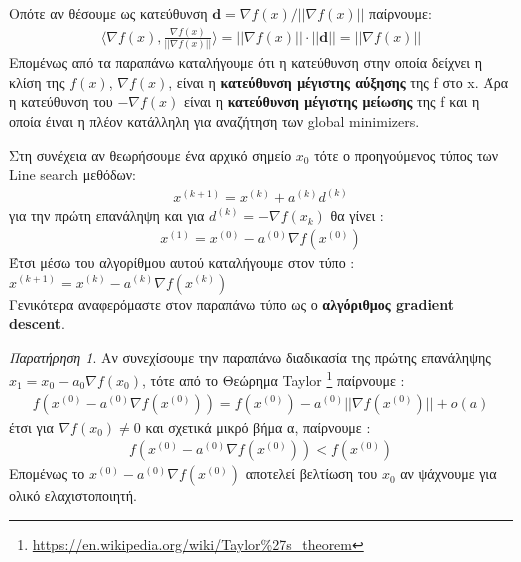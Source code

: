 \documentclass[a4paper,12pt,twoside]{report}
\theoremstyle{plain}
\theoremstyle{definition}
\theoremstyle{remark}
\newtheorem*{rem}{Παρατήρηση}
\begin{document}
Οπότε αν θέσουμε ως κατεύθυνση $\textbf{d} = \nabla f(x)/||\nabla f(x)||$ παίρνουμε:
\begin{align*}
\langle\nabla f(x), \frac{\nabla f(x)}{||\nabla f(x)||}\rangle = ||\nabla f(x)||\cdot||\textbf{d}||= ||\nabla f(x)||
\end{align*}
Επομένως από τα παραπάνω καταλήγουμε ότι η κατεύθυνση στην οποία δείχνει η κλίση της $f(x)$, $\nabla f(x)$, είναι η \textbf{κατεύθυνση μέγιστης αύξησης} της f	στο x. Άρα η κατεύθυνση του $-\nabla f(x)$ είναι η \textbf{κατεύθυνση μέγιστης μείωσης} της f και η οποία έιναι η πλέον κατάλληλη για αναζήτηση των global minimizers.

Στη συνέχεια αν θεωρήσουμε ένα αρχικό σημείο $x_0$ τότε ο προηγούμενος τύπος των Line search μεθόδων: 
\begin{align*}
x^{(k+1)} = x^{(k)} + a^{(k)}d^{(k)}
\end{align*}
για την πρώτη επανάληψη  και για $d^{(k)} = -\nabla f(x_k)$ θα γίνει : 
\begin{align*}
x^{(1)} = x^{(0)} - a^{(0)}\nabla f(x^{(0)})
\end{align*}
Έτσι μέσω του αλγορίθμου αυτού καταλήγουμε στον τύπο : $x^{(k+1)} = x^{(k)} - a^{(k)}\nabla f(x^{(k)})$\\
Γενικότερα αναφερόμαστε στον παραπάνω τύπο ως ο \textbf{αλγόριθμος gradient descent}.

\begin{rem}
Αν συνεχίσουμε την παραπάνω διαδικασία της πρώτης επανάληψης\\ $x_1 = x_0 - a_0\nabla f(x_0)$, τότε από το Θεώρημα Taylor \footnote{\url{https://en.wikipedia.org/wiki/Taylor\%27s\_theorem}} παίρνουμε :
\begin{align*}
f(x^{(0)} - a^{(0)}\nabla f(x^{(0)})) = f(x^{(0)}) - a^{(0)}||\nabla f(x^{(0)})|| + o(a) 
\end{align*}
έτσι για $\nabla f(x_0) \neq 0$ και σχετικά μικρό βήμα α, παίρνουμε : 
\begin{align*}
f(x^{(0)} - a^{(0)}\nabla f(x^{(0)})) < f(x^{(0)})
\end{align*}
Επομένως το $x^{(0)} - a^{(0)}\nabla f(x^{(0)})$ αποτελεί βελτίωση του $x_0$ αν ψάχνουμε για ολικό ελαχιστοποιητή.
\end{rem}

\end{document}
